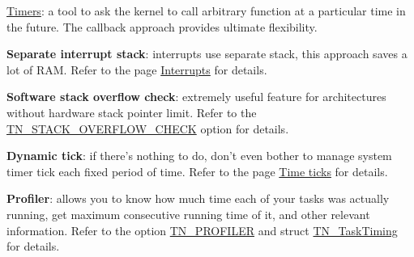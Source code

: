 \begin{DoxyItemize}
\item \hyperlink{tn__timer_8h}{Timers}\+: a tool to ask the kernel to call arbitrary function at a particular time in the future. The callback approach provides ultimate flexibility.
\item {\bfseries Separate interrupt stack}\+: interrupts use separate stack, this approach saves a lot of R\+A\+M. Refer to the page \hyperlink{interrupts}{Interrupts} for details.
\item {\bfseries Software stack overflow check}\+: extremely useful feature for architectures without hardware stack pointer limit. Refer to the {\ttfamily \hyperlink{tn__cfg__default_8h_ac6a9bbac3b3b25d9b5bc8c21d2e09955}{T\+N\+\_\+\+S\+T\+A\+C\+K\+\_\+\+O\+V\+E\+R\+F\+L\+O\+W\+\_\+\+C\+H\+E\+C\+K}} option for details.
\item {\bfseries Dynamic tick}\+: if there's nothing to do, don't even bother to manage system timer tick each fixed period of time. Refer to the page \hyperlink{time_ticks}{Time ticks} for details.
\item {\bfseries Profiler}\+: allows you to know how much time each of your tasks was actually running, get maximum consecutive running time of it, and other relevant information. Refer to the option {\ttfamily \hyperlink{tn__cfg__default_8h_a49a546b18cc1f75b51d4cf8b290634dd}{T\+N\+\_\+\+P\+R\+O\+F\+I\+L\+E\+R}} and {\ttfamily struct \hyperlink{structTN__TaskTiming}{T\+N\+\_\+\+Task\+Timing}} for details. 
\end{DoxyItemize}
